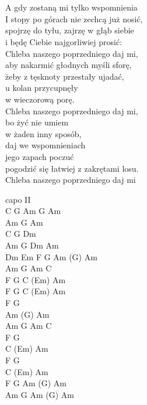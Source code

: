 \begin{text}
\vin \\
\vin \\
A gdy zostaną mi tylko wspomnienia\\
I stopy po górach nie zechcą już nosić,\\
spojrzę do tyłu, zajrzę w głąb siebie\\
i będę Ciebie najgorliwiej prosić:\\

Chleba naszego poprzedniego daj mi,\\
aby nakarmić głodnych myśli sforę,\\
żeby z tęsknoty przestały ujadać,\\
u kolan przycupnęły\\
w wieczorową porę.\\

Chleba naszego poprzedniego daj mi,\\
bo żyć nie umiem\\
w żaden inny sposób,\\
daj we wspomnieniach\\
jego zapach poczuć\\
pogodzić się łatwiej z zakrętami losu.\\

Chleba naszego poprzedniego daj mi\\
\end{text}
\begin{chord}
\vin capo II\\
C G Am G Am\\
Am G Am\\
C G Dm\\
Am G Dm Am\\
Dm Em F G Am (G) Am\\

Am G Am C\\
F G C (Em) Am\\
F G C (Em) Am\\
F G\\
Am (G) Am\\

Am G Am C\\
F G\\
C (Em) Am\\
F G\\
C (Em) Am\\
F G Am (G) Am\\

Am G Am (G) Am\\
\end{chord}

